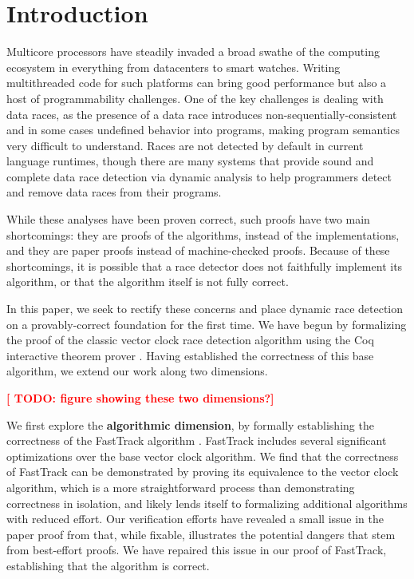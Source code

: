 \documentclass[preprint, 10pt]{sigplanconf}
\newcommand{\TODO}[1]{\textbf{\textcolor{red}{[ TODO: #1]}}}
\begin{document}
\section{Introduction}

Multicore processors have steadily invaded a broad swathe of the computing ecosystem in everything from datacenters to smart watches. Writing multithreaded code for such platforms can bring good performance but also a host of programmability challenges. One of the key challenges is dealing with data races, as the presence of a data race introduces non-sequentially-consistent \cite{manson_java_2005} and in some cases undefined \cite{boehm_foundations_2008} behavior into programs, making program semantics very difficult to understand. Races are not detected by default in current language runtimes, though there are many systems that provide sound and complete data race detection via dynamic analysis \cite{djit+,fasttrack,slimstate,slimfast} to help programmers detect and remove data races from their programs. 

While these analyses have been proven correct, such proofs have two main shortcomings: they are proofs of the algorithms, instead of the implementations, and they are paper proofs instead of machine-checked proofs. Because of these shortcomings, it is possible that a race detector does not faithfully implement its algorithm, or that the algorithm itself is not fully correct. 

In this paper, we seek to rectify these concerns and place dynamic race detection on a provably-correct foundation for the first time. We have begun by formalizing the proof of the classic vector clock race detection algorithm \cite{fidge,friedmann_mattern} using the Coq interactive theorem prover \cite{coq}. Having established the correctness of this base algorithm, we extend our work along two dimensions. 

\TODO{figure showing these two dimensions?}

We first explore the \textbf{algorithmic dimension}, by formally establishing the correctness of the FastTrack algorithm \cite{fasttrack}. FastTrack includes several significant optimizations over the base vector clock algorithm. We find that the correctness of FastTrack can be demonstrated by proving its equivalence to the vector clock algorithm, which is a more straightforward process than demonstrating correctness in isolation, and likely lends itself to formalizing additional algorithms with reduced effort. Our verification efforts have revealed a small issue in the paper proof from \cite{fasttrack} that, while fixable, illustrates the potential dangers that stem from best-effort proofs. We have repaired this issue in our proof of FastTrack, establishing that the algorithm is correct.
\end{document}
